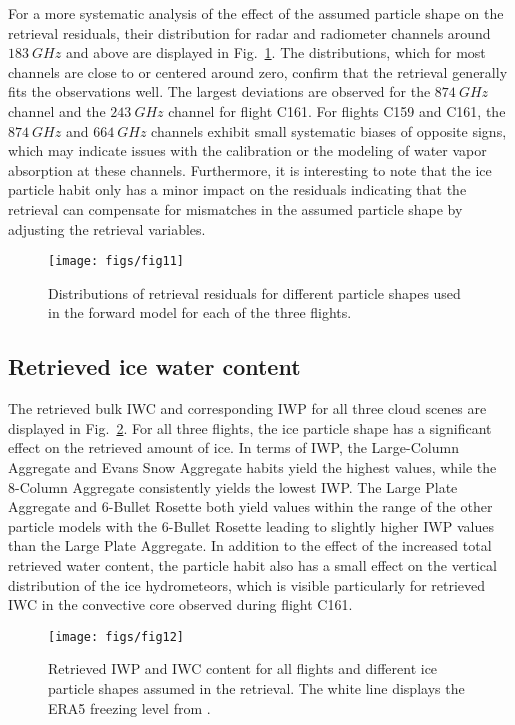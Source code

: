 \documentclass[journal abbreviation, manuscript]{copernicus}
\begin{document}
For a more systematic analysis of the effect of the assumed particle shape on
the retrieval residuals, their distribution for radar and radiometer channels
around $183\ \unit{GHz}$ and above are displayed in
Fig.~\ref{fig:residuals_box}. The distributions, which for most channels are
close to or centered around zero, confirm that the retrieval generally fits the
observations well. The largest deviations are observed for the $874\ \unit{GHz}$
channel and the $243\ \unit{GHz}$ channel for flight C161. For flights C159 and
C161, the $874\ \unit{GHz}$ and $664\ \unit{GHz}$ channels exhibit small
systematic biases of opposite signs, which may indicate issues with the
calibration or the modeling of water vapor absorption at these channels.
Furthermore, it is interesting to note that the ice particle habit only has a
minor impact on the residuals indicating that the retrieval can compensate for
mismatches in the assumed particle shape by adjusting the retrieval variables.


\begin{figure}[!hbpt]
  \centering
  \texttt{[image: figs/fig11]}
  \caption{Distributions of retrieval residuals for different particle
    shapes used in the forward model for each of the three flights.}
  \label{fig:residuals_box}
\end{figure}

\subsection{Retrieved ice water content}

The retrieved bulk IWC and corresponding IWP for all three cloud scenes are
displayed in Fig.~\ref{fig:ice_water_content}. For all three flights, the ice
particle shape has a significant effect on the retrieved amount of ice. In terms
of IWP, the Large-Column Aggregate and Evans Snow Aggregate habits yield the
highest values, while the 8-Column Aggregate consistently yields the lowest IWP.
The Large Plate Aggregate and 6-Bullet Rosette both yield values within the
range of the other particle models with the 6-Bullet Rosette leading to slightly
higher IWP values than the Large Plate Aggregate. In addition to the effect of
the increased total retrieved water content, the particle habit also has a small
effect on the vertical distribution of the ice hydrometeors, which is visible
particularly for retrieved IWC in the convective core observed during flight
C161.


\begin{figure}[!hbpt]
  \centering
  \texttt{[image: figs/fig12]}
  \caption{Retrieved IWP and IWC content for all flights and different ice
    particle shapes assumed in the retrieval. The white line displays the ERA5
    freezing level from \citet{era5}.
  }
  \label{fig:ice_water_content}
\end{figure}
\end{document}
